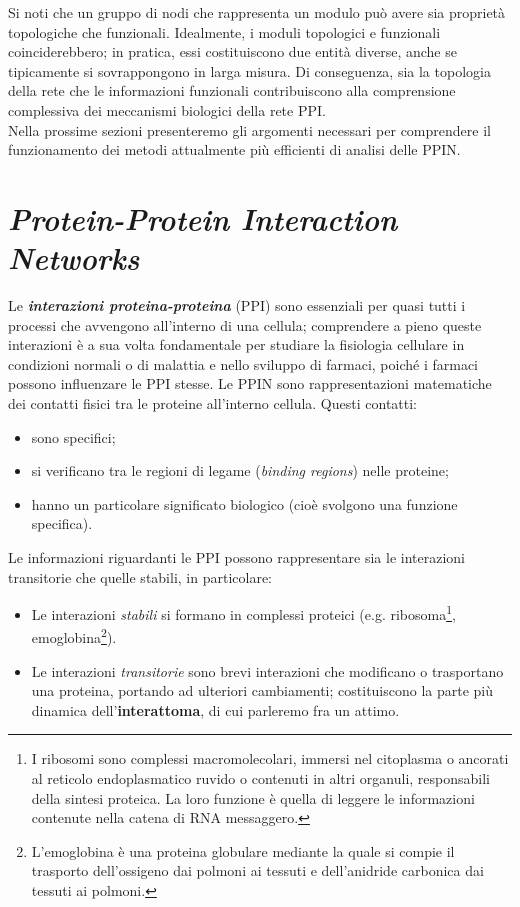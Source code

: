 \documentclass[11pt]{article}
\begin{document}
Si noti che un gruppo di nodi che rappresenta un modulo può avere sia proprietà topologiche che funzionali. Idealmente, i moduli topologici e funzionali coinciderebbero; in pratica, essi costituiscono due entità diverse, anche se tipicamente si sovrappongono in larga misura. Di conseguenza, sia la topologia della rete che le informazioni funzionali contribuiscono alla comprensione complessiva dei meccanismi biologici della rete PPI.\\

Nella prossime sezioni presenteremo gli argomenti necessari per comprendere il funzionamento dei metodi attualmente più efficienti di analisi delle PPIN.

\newpage
\section{\textit{Protein-Protein Interaction Networks}}
Le \textit{\textbf{interazioni proteina-proteina}} (PPI) sono essenziali per quasi tutti i processi che avvengono all'interno di una cellula; comprendere a pieno queste interazioni è a sua volta fondamentale per studiare la fisiologia cellulare in condizioni normali o di malattia e nello sviluppo di farmaci, poiché i farmaci possono influenzare le PPI stesse. Le PPIN sono rappresentazioni matematiche dei contatti fisici tra le proteine all'interno cellula. Questi contatti:
\begin{itemize}
\setlength{\itemsep}{1pt}
  \setlength{\parskip}{0pt}
  \setlength{\parsep}{0pt}
\item sono specifici;
\item si verificano tra le regioni di legame (\textit{binding regions}) nelle proteine;
\item hanno un particolare significato biologico (cioè svolgono una funzione specifica).
\end{itemize}
Le informazioni riguardanti le PPI possono rappresentare sia le interazioni transitorie che quelle stabili, in particolare:
\begin{itemize}
\setlength{\itemsep}{1pt}
  \setlength{\parskip}{0pt}
  \setlength{\parsep}{0pt}
\item Le interazioni \textit{stabili} si formano in complessi proteici (e.g. ribosoma\footnote{I ribosomi sono complessi macromolecolari, immersi nel citoplasma o ancorati al reticolo endoplasmatico ruvido o contenuti in altri organuli, responsabili della sintesi proteica. La loro funzione è quella di leggere le informazioni contenute nella catena di RNA messaggero.}, emoglobina\footnote{L'emoglobina è una proteina globulare mediante la quale si compie il trasporto dell'ossigeno dai polmoni ai tessuti e dell'anidride carbonica dai tessuti ai polmoni.}).
\item Le interazioni \textit{transitorie} sono brevi interazioni che modificano o trasportano una proteina, portando ad ulteriori cambiamenti; costituiscono la parte più dinamica dell'\textbf{interattoma}, di cui parleremo fra un attimo.
\end{itemize}
\end{document}
